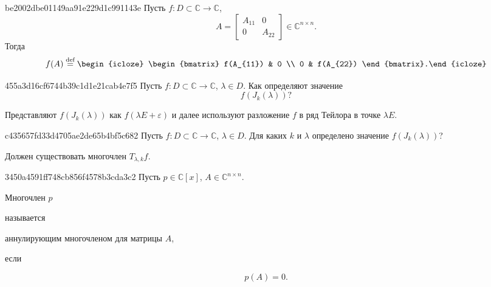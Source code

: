 \begin{note}{be2002dbe01149aa91e229d1c991143e}
    Пусть \({ f : D \subset \mathbb C \to \mathbb C }\),
    \[
        A = \begin{bmatrix}
            A_{11} & 0 \\
            0 & A_{22}
        \end{bmatrix}
        \in \mathbb C^{n \times n}.
    \]
    Тогда
    \[
        f(A) \overset{\text{def}}= \begin{icloze}{1}\begin{bmatrix}
            f(A_{11}) & 0 \\
            0 & f(A_{22})
        \end{bmatrix}.\end{icloze}
    \]
\end{note}

\begin{note}{455a3d16cf6744b39c1d1e21cab4e7f5}
    Пусть \({ f : D \subset \mathbb C \to \mathbb C }\), \({ \lambda \in D }\).
    Как определяют значение
    \[
        f(J_k(\lambda))?
    \]

    \begin{cloze}{1}
        Представляют \({ f(J_k(\lambda)) }\) как \({ f(\lambda E + \varepsilon) }\) и далее используют разложение \({ f }\) в ряд Тейлора в точке \({ \lambda E }\).
    \end{cloze}
\end{note}

\begin{note}{c435657fd33d4705ae2de65b4bf5c682}
    Пусть \({ f : D \subset \mathbb C \to \mathbb C }\), \({ \lambda \in D }\).
    Для каких \({ k }\) и \({ \lambda }\) определено значение \({ f(J_k (\lambda)) }\)?

    \begin{cloze}{1}
        Должен существовать многочлен \({ T_{\lambda, k} f }\).
   \end{cloze}
\end{note}

\begin{note}{3450a4591ff748cb856f4578b3cda3c2}
    Пусть \({ p \in \mathbb C[x] }\),\: \({ A \in \mathbb C^{n \times n} }\). \begin{icloze}{1}Многочлен \( p \)\end{icloze} называется \begin{icloze}{2}аннулирующим многочленом для матрицы \( A \),\end{icloze} если
    \begin{icloze}{1}
        \[
            p(A) = 0.
        \]
    \end{icloze}
\end{note}

